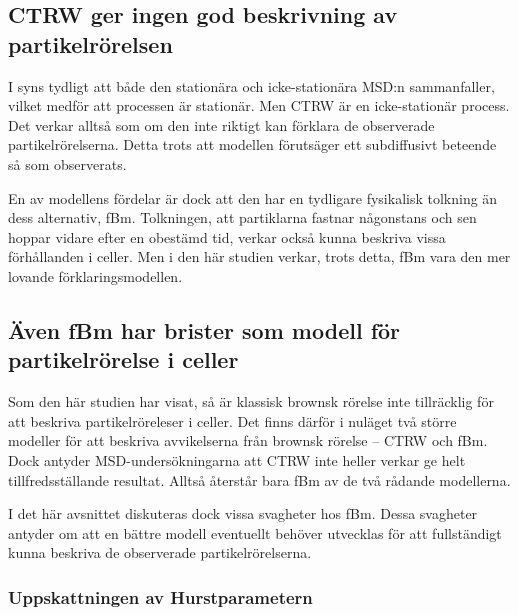 


\subsection{CTRW ger ingen god beskrivning av partikelrörelsen}
I  syns tydligt att både den stationära och icke-stationära MSD:n sammanfaller, vilket medför att processen är stationär. Men CTRW är en icke-stationär process. Det verkar alltså som om den inte riktigt kan förklara de observerade partikelrörelserna. Detta trots att modellen förutsäger ett subdiffusivt beteende så som observerats.

En av modellens fördelar är dock att den har en tydligare fysikalisk tolkning än dess alternativ, fBm. Tolkningen, att partiklarna fastnar någonstans och sen hoppar vidare efter en obestämd tid, verkar också kunna beskriva vissa förhållanden i celler\cite{Barkai_CTRW}. Men i den här studien verkar, trots detta, fBm vara den mer lovande förklaringsmodellen. 


\subsection{Även fBm har brister som modell för partikelrörelse i celler}

Som den här studien har visat, så är klassisk brownsk rörelse inte tillräcklig för att beskriva partikelröreleser i celler. Det finns därför i nuläget två större modeller för att beskriva avvikelserna från brownsk rörelse -- CTRW och fBm. Dock antyder MSD-undersökningarna att CTRW inte heller verkar ge helt tillfredsställande resultat. Alltså återstår bara fBm av de två rådande modellerna. 

I det här avsnittet diskuteras dock vissa svagheter hos fBm. Dessa svagheter antyder om att en bättre modell eventuellt behöver utvecklas för att fullständigt kunna beskriva de observerade partikelrörelserna.


\subsubsection{Uppskattningen av Hurstparametern}

